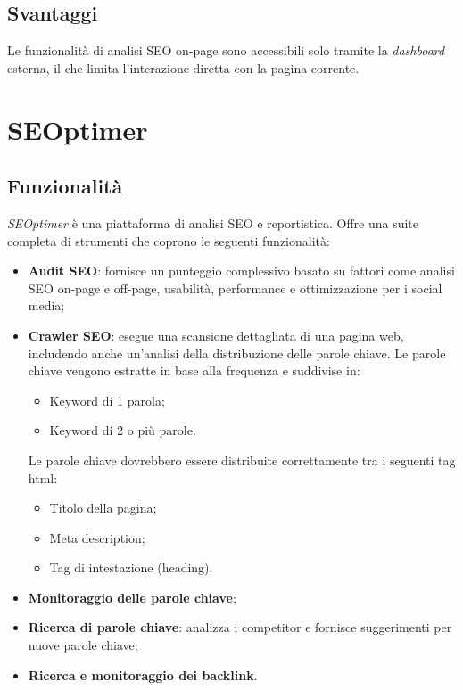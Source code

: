 \subsection{Svantaggi}
\par Le funzionalità di analisi SEO on-page sono accessibili solo tramite la \textit{dashboard} esterna, il che limita l'interazione diretta con la pagina corrente.

\section{SEOptimer}

\subsection{Funzionalità}
\par \textit{SEOptimer} è una piattaforma di analisi SEO e reportistica. Offre una suite completa di strumenti che coprono le seguenti funzionalità:
\begin{itemize}
    \item \textbf{Audit SEO}: fornisce un punteggio complessivo basato su fattori come analisi SEO \gls{on-page} e \gls{off-page}, usabilità, performance e ottimizzazione per i social media;
    \item \textbf{Crawler SEO}: esegue una scansione dettagliata di una pagina web, includendo anche un'analisi della distribuzione delle parole chiave. Le parole chiave vengono estratte in base alla frequenza e suddivise in:
    \begin{itemize}
        \item Keyword di 1 parola;
        \item Keyword di 2 o più parole.
    \end{itemize}
    Le parole chiave dovrebbero essere distribuite correttamente tra i seguenti tag \gls{html}: 
    \begin{itemize}
        \item Titolo della pagina;
        \item Meta description;
        \item Tag di intestazione (heading).
    \end{itemize}
    \item \textbf{Monitoraggio delle parole chiave};
    \item \textbf{Ricerca di parole chiave}: analizza i competitor e fornisce suggerimenti per nuove parole chiave;
    \item \textbf{Ricerca e monitoraggio dei \gls{backlink}}.
\end{itemize}


